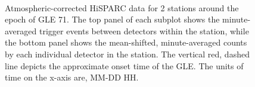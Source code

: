 \begin{figure}[ht]
	\centering
	 \\
	
	
	\caption{Atmospheric-corrected HiSPARC data for 2 stations around the epoch of GLE 71. The top panel of each subplot shows the minute-averaged trigger events between detectors within the station, while the bottom panel shows the mean-shifted, minute-averaged counts by each individual detector in the station. The vertical red, dashed line depicts the approximate onset time of the GLE. The units of time on the x-axis are, MM-DD HH.}
	\label{fig:GLE_71_Pcorr}
\end{figure}

